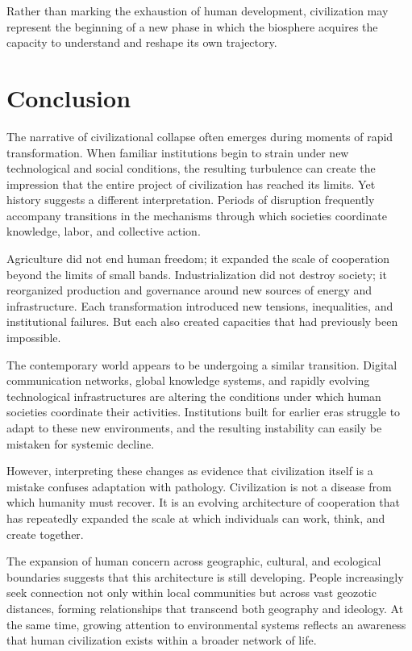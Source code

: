 \documentclass[12pt]{article}
\begin{document}
Rather than marking the exhaustion of human development, civilization may represent the beginning of a new phase in which the biosphere acquires the capacity to understand and reshape its own trajectory.

\section{Conclusion}

The narrative of civilizational collapse often emerges during moments of rapid transformation. When familiar institutions begin to strain under new technological and social conditions, the resulting turbulence can create the impression that the entire project of civilization has reached its limits. Yet history suggests a different interpretation. Periods of disruption frequently accompany transitions in the mechanisms through which societies coordinate knowledge, labor, and collective action.

Agriculture did not end human freedom; it expanded the scale of cooperation beyond the limits of small bands. Industrialization did not destroy society; it reorganized production and governance around new sources of energy and infrastructure. Each transformation introduced new tensions, inequalities, and institutional failures. But each also created capacities that had previously been impossible.

The contemporary world appears to be undergoing a similar transition. Digital communication networks, global knowledge systems, and rapidly evolving technological infrastructures are altering the conditions under which human societies coordinate their activities. Institutions built for earlier eras struggle to adapt to these new environments, and the resulting instability can easily be mistaken for systemic decline.

However, interpreting these changes as evidence that civilization itself is a mistake confuses adaptation with pathology. Civilization is not a disease from which humanity must recover. It is an evolving architecture of cooperation that has repeatedly expanded the scale at which individuals can work, think, and create together.

The expansion of human concern across geographic, cultural, and ecological boundaries suggests that this architecture is still developing. People increasingly seek connection not only within local communities but across vast geozotic distances, forming relationships that transcend both geography and ideology. At the same time, growing attention to environmental systems reflects an awareness that human civilization exists within a broader network of life.
\end{document}
